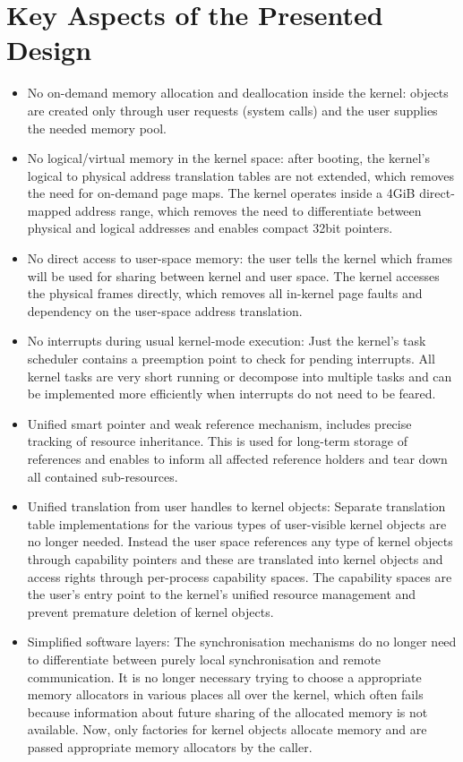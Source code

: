 \section{Key Aspects of the Presented Design}

\begin{itemize}
\item No on-demand memory allocation and deallocation inside the kernel: objects are created only through user requests (system calls) and the user supplies the needed memory pool.
\item No logical/virtual memory in the kernel space: after booting, the kernel's logical to physical address translation tables are not extended, which removes the need for on-demand page maps. The kernel operates inside a 4GiB direct-mapped address range, which removes the need to differentiate between physical and logical addresses and enables compact 32bit pointers.
\item No direct access to user-space memory: the user tells the kernel which frames will be used for sharing between kernel and user space. The kernel accesses the physical frames directly, which removes all in-kernel page faults and dependency on the user-space address translation.
\item No interrupts during usual kernel-mode execution: Just the kernel's task scheduler contains a preemption point to check for pending interrupts. All kernel tasks are very short running or decompose into multiple tasks and can be implemented more efficiently when interrupts do not need to be feared.  
\item Unified smart pointer and weak reference mechanism, includes precise tracking of resource inheritance. This is used for long-term storage of references and enables to inform all affected reference holders and tear down all contained sub-resources.
\item Unified translation from user handles to kernel objects: Separate translation table implementations for the various types of user-visible kernel objects are no longer needed. Instead the user space references any type of kernel objects through capability pointers and these are translated into kernel objects and access rights through per-process capability spaces. The capability spaces are the user's entry point to the kernel's unified resource management and prevent premature deletion of kernel objects.
\item Simplified software layers: The synchronisation mechanisms do no longer need to differentiate between purely local synchronisation and remote communication. It is no longer necessary trying to choose a appropriate memory allocators in various places all over the kernel, which often fails because information about future sharing of the allocated memory is not available. Now, only factories for kernel objects allocate memory and are passed appropriate memory allocators by the caller.

\end{itemize}
